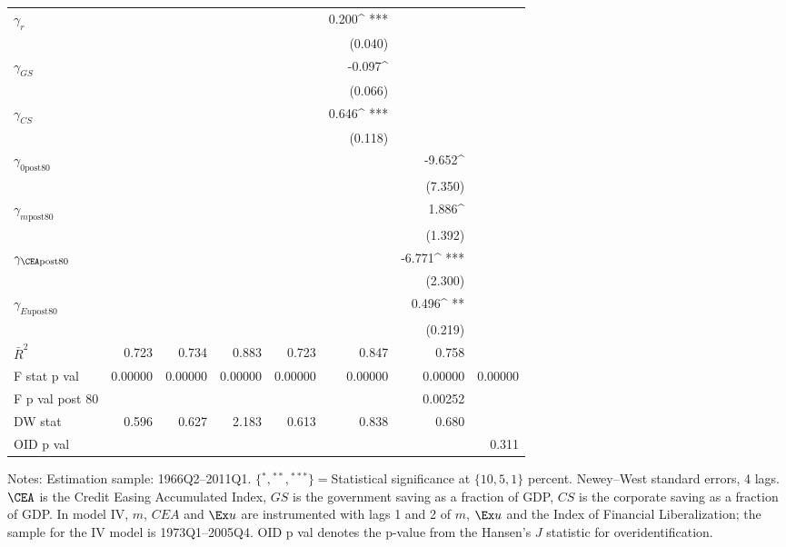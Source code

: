 \begin{table}
\begin{center}
\begin{tabular}{@{}ld{6}d{6}d{6}d{6}d{6}d{6}d{6}@{}}
 $\gamma_{r}$  &   & & & & 0.200^{ ***}  & & \\
 &   &  & & & (0.040)  & & \\
 $\gamma_{GS}$  &   & & & & -0.097^{ }  & & \\
 &   &  & & & (0.066)  &  & \\
 $\gamma_{CS}$  &   & & & &0.646^{ ***}  & & \\
 &   &  & & & (0.118)  & & \\
 $\gamma_{\text{0post80}}$  &   & & & & &-9.652^{ }  &  \\
 &   &  & & & & (7.350)   & \\
 $\gamma_{m\text{post80}}$  &   & & & & &1.886^{ }  &  \\
 &   &  & &  & &(1.392)  &  \\
 $\gamma_{\CEA\text{post80}}$  &   & & & & &-6.771^{ ***}  & \\
 &   &  & & & &(2.300)  & \\
 $\gamma_{Eu\text{post80}}$  &   & & & & &0.496^{ **}  &  \\
 &   &  & &  & & (0.219)  &  \\
\midrule
 $\bar{R}^2$  & 0.723  & 0.734  & 0.883  & 0.723  & 0.847  & 0.758  & \\
 F stat p val  & 0.00000  & 0.00000  & 0.00000  & 0.00000  & 0.00000  & 0.00000  & 0.00000\\
 F p val post 80 &  & & & & & 0.00252  &  \\
DW stat  & 0.596  & 0.627  & 2.183  & 0.613  & 0.838  & 0.680 & \\
OID p val &  & & & &  & & 0.311\\
\bottomrule
\end{tabular}
\end{center}
 {\footnotesize Notes: Estimation sample: 1966Q2--2011Q1. $\{{}^*,{}^{**},{}^{***}\}={}$Statistical significance at $\{10,5,1\}$ percent. Newey--West standard errors, 4 lags. $\CEA$ is the Credit Easing Accumulated Index, $GS$ is the government saving as a fraction of GDP, $CS$ is the corporate saving as a fraction of GDP. In model IV, $m$, $CEA$ and $\Ex u$ are instrumented with lags 1 and 2 of $m$, $\Ex u$ and the \cite{abiadEtAl_FinReforms} Index of Financial Liberalization; the sample for the IV model is 1973Q1--2005Q4. OID p val denotes the p-value from the Hansen's $J$ statistic for overidentification.}
\end{table}
